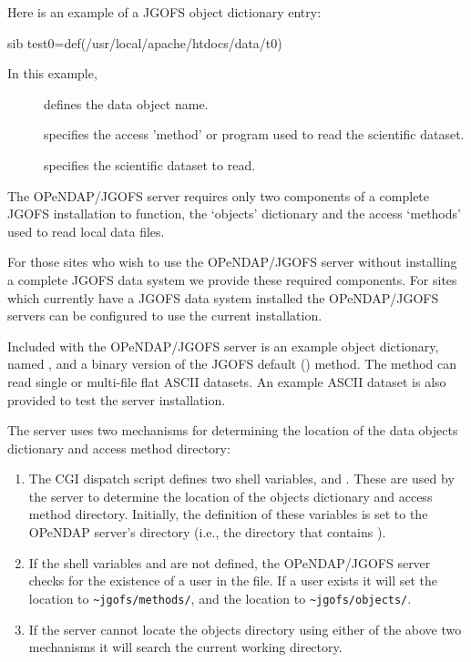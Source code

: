\documentclass{dods-book}
\begin{document}
Here is an example of a JGOFS object dictionary entry:

\begin{vcode}{sib}
test0=def(/usr/local/apache/htdocs/data/t0) 
\end{vcode}

In this example, 

\begin{description}
\item[]  defines the data object name.
\item[] specifies the access 'method' or program used to read
  the scientific dataset.
\item[] specifies the scientific
  dataset to read.
\end{description}
         
The OPeNDAP/JGOFS server requires only two components of a complete JGOFS 
installation to function, the `objects' dictionary and the access 
`methods' used to read local data files.

For those sites who wish to use the OPeNDAP/JGOFS server without
installing a complete JGOFS data system we provide these required
components.  For sites which currently have a JGOFS data system 
installed the OPeNDAP/JGOFS servers can be configured to use the current 
installation.
 
Included with the OPeNDAP/JGOFS server is an example object dictionary,
named , and a binary version of the JGOFS default
() method.  The  method can read single or
multi-file flat ASCII datasets.  An example ASCII dataset is also
provided to test the server installation.


The server uses two mechanisms for determining the location of the data 
objects dictionary and access method directory:

\begin{enumerate}
\item The CGI dispatch script  defines two shell
  variables,  and .  These are
  used by the server to determine the location of the objects
  dictionary and access method directory.  Initially, the definition
  of these variables is set to the OPeNDAP server's directory (i.e.,
  the directory that contains ).
  
\item If the shell variables  and 
  are not defined, the OPeNDAP/JGOFS server checks for the existence of a
   user in the  file.  If a 
  user exists it will set the  location to
  \verb+~jgofs/methods/+, and the  location to
  \verb+~jgofs/objects/+.
  
\item If the server cannot locate the objects directory using either
  of the above two mechanisms it will search the current working
  directory.
\end{enumerate}
\end{document}
